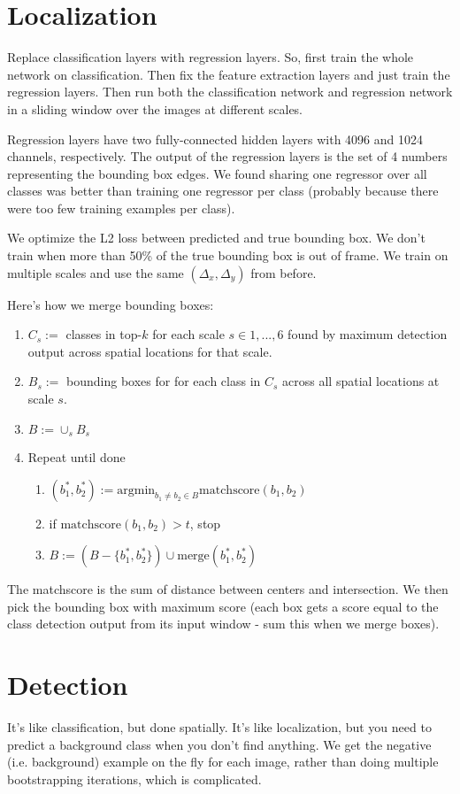 \documentclass[a4paper]{article}
\begin{document}
\section{Localization}
Replace classification layers with regression layers. So, first train the
whole network on classification. Then fix the feature extraction layers and
just train the regression layers. Then run both the classification network and
regression network in a sliding window over the images at different scales.

Regression layers have two fully-connected hidden layers with 4096 and 1024
channels, respectively. The output of the regression layers is the set of 4
numbers representing the bounding box edges. We found sharing one regressor
over all classes was better than training one regressor per class (probably
because there were too few training examples per class).

We optimize the L2 loss between predicted and true bounding box. We don't train
when more than 50\% of the true bounding box is out of frame. We train on
multiple scales and use the same $(\Delta_x, \Delta_y)$ from before.

Here's how we merge bounding boxes:
\begin{enumerate}
  \item $C_s := $ classes in top-$k$ for each scale $s \in {1, ..., 6}$ found
  by maximum detection output across spatial locations for that scale.
  \item $B_s := $ bounding boxes for for each class in $C_s$ across all spatial
  locations at scale $s$.
  \item $B := \cup_s B_s$
  \item Repeat until done
  \begin{enumerate}
    \item $(b_1^*, b_2^*) := \textrm{argmin}_{b_1 \ne b_2 \in B}
    {\textrm{matchscore}(b_1, b_2)}$
    \item if $\textrm{matchscore}(b_1, b_2) > t$, stop
    \item $B := (B - \{b_1^*, b_2^*\}) \cup \textrm{merge}(b_1^*, b_2^*)$
  \end{enumerate}
\end{enumerate}

The matchscore is the sum of distance between centers and intersection. We then
pick the bounding box with maximum score (each box gets a score equal to the
class detection output from its input window - sum this when we merge boxes).

\section{Detection}
It's like classification, but done spatially. It's like localization, but you
need to predict a background class when you don't find anything. We get the
negative (i.e. background) example on the fly for each image, rather than doing
multiple bootstrapping iterations, which is complicated.
\end{document}
